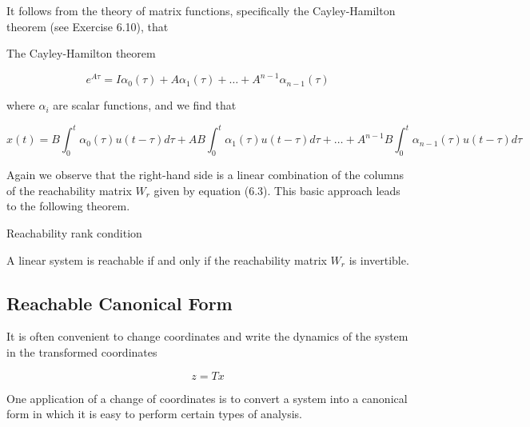 It follows from the theory of matrix functions, specifically the Cayley-Hamilton
theorem (see Exercise 6.10), that


\begin{framed}
\theoremstyle{remark}
\begin{remark}{The Cayley-Hamilton theorem}

\end{remark}
\end{framed}

\begin{equation}
e^{A\tau}  = I\alpha_0(\tau) + A\alpha_1(\tau) + \dots + A^{n-1}\alpha_{n-1}(\tau)
\end{equation}

where $\alpha_i$ are scalar functions, and we find that 

\begin{equation}
x(t)  = B\int_{0}^{t} \alpha_0(\tau)u(t-\tau)d\tau + AB\int_{0}^{t} \alpha_1(\tau)u(t-\tau)d\tau+ \dots + A^{n-1}B\int_{0}^{t} \alpha_{n-1}(\tau)u(t-\tau)d\tau  
\end{equation}

Again we observe that the right-hand side is a linear combination of the columns
of the reachability matrix $W_r$ given by equation (6.3). This basic approach leads to
the following theorem.

\begin{framed}
\theoremstyle{theorem}
\begin{theorem}{Reachability rank condition}

 A linear system is reachable if and
only if the reachability matrix $W_r$ is invertible.
\end{theorem}
\end{framed}


\subsection{Reachable Canonical Form}
\label{reachable_canonical_form}

It is often convenient to change coordinates and write the dynamics of the system in the transformed coordinates

\begin{equation}
z = Tx
\end{equation}

One application of a change of coordinates is to convert a system into a
canonical form in which it is easy to perform certain types of analysis.


